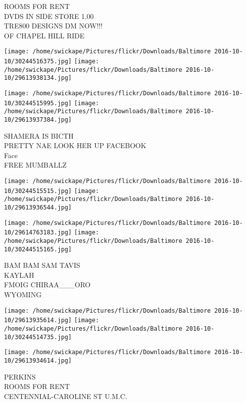 \documentclass[10pt,letterpaper]{article}
\begin{document}
ROOMS FOR RENT\\
DVDS IN SIDE STORE 1.00\\
TRE800 DESIGNS DM NOW!!!\\
OF CHAPEL HILL RIDE\\
\pagebreak

\texttt{[image: /home/swickape/Pictures/flickr/Downloads/Baltimore 2016-10-10/30244516375.jpg]}
\texttt{[image: /home/swickape/Pictures/flickr/Downloads/Baltimore 2016-10-10/29613938134.jpg]}

\texttt{[image: /home/swickape/Pictures/flickr/Downloads/Baltimore 2016-10-10/30244515995.jpg]}
\texttt{[image: /home/swickape/Pictures/flickr/Downloads/Baltimore 2016-10-10/29613937384.jpg]}

SHAMERA IS BICTH\\
PRETTY NAE LOOK HER UP FACEBOOK\\
Face\\
FREE MUMBALLZ\\
\pagebreak

\texttt{[image: /home/swickape/Pictures/flickr/Downloads/Baltimore 2016-10-10/30244515515.jpg]}
\texttt{[image: /home/swickape/Pictures/flickr/Downloads/Baltimore 2016-10-10/29613936544.jpg]}

\texttt{[image: /home/swickape/Pictures/flickr/Downloads/Baltimore 2016-10-10/29614763183.jpg]}
\texttt{[image: /home/swickape/Pictures/flickr/Downloads/Baltimore 2016-10-10/30244515165.jpg]}

BAM BAM SAM TAVIS\\
KAYLAH\\
FMOIG CHIRAA\_\_\_ORO\\
WYOMING\\
\pagebreak

\texttt{[image: /home/swickape/Pictures/flickr/Downloads/Baltimore 2016-10-10/29613935614.jpg]}
\texttt{[image: /home/swickape/Pictures/flickr/Downloads/Baltimore 2016-10-10/30244514735.jpg]}

\vspace{0.25in}
\texttt{[image: /home/swickape/Pictures/flickr/Downloads/Baltimore 2016-10-10/29613934614.jpg]}

PERKINS\\
ROOMS FOR RENT\\
CENTENNIAL{-}CAROLINE ST U.M.C.\\
\pagebreak
\end{document}
